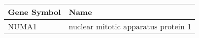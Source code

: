 \begin{tabular}{ll}
\toprule
Gene Symbol &                                Name \\
\midrule
      NUMA1 & nuclear mitotic apparatus protein 1 \\
\bottomrule
\end{tabular}
